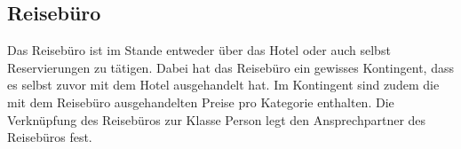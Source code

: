 \documentclass[../../Pflichtenheft.tex]{subfiles}
\begin{document}
    \subsection{Reisebüro}
    Das Reisebüro ist im Stande entweder über das Hotel oder auch selbst Reservierungen zu tätigen.
    Dabei hat das Reisebüro ein gewisses Kontingent, dass es selbst zuvor mit dem Hotel ausgehandelt hat. Im Kontingent sind zudem
    die mit dem Reisebüro ausgehandelten Preise pro Kategorie enthalten. Die Verknüpfung des Reisebüros
    zur Klasse Person legt den Ansprechpartner des Reisebüros fest.
\end{document}

